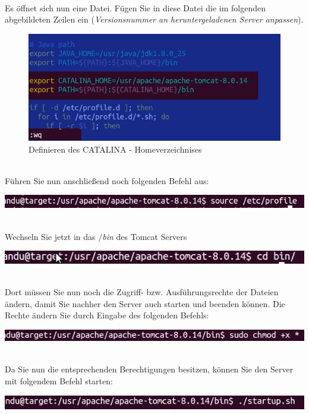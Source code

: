\documentclass[a4paper, 12pt]{scrreprt}
\begin{document}
\newpage
\ \\
Es öffnet sich nun eine Datei. Fügen Sie in diese Datei die im folgenden abgebildeten Zeilen ein ({\it Versionsnummer an heruntergeladenen Server anpassen}).
\begin{figure}[h]
\centering
\includegraphics[width=0.7\linewidth]{Grafiken/Catalina_Home}
\caption{Definieren des CATALINA - Homeverzeichnises}
\label{fig:Catalina_Home}
\end{figure}
\ \\
Führen Sie nun anschließend noch folgenden Befehl aus:
\begin{center}
\includegraphics[width=0.8\linewidth]{Grafiken/Befehl_idonKnow}
\end{center}
\ \\
Wechseln Sie jetzt in das {\it$/$bin} des Tomcat Servers
\begin{center}
\includegraphics[width=0.7\linewidth]{Grafiken/Bin_direct}
\end{center}
\ \\
Dort müssen Sie nun noch die Zugriff- bzw. Ausführungsrechte der Dateien ändern, damit Sie nachher den Server auch starten und beenden können. Die Rechte ändern Sie durch Eingabe des folgenden Befehls:
\begin{center}
\includegraphics[width=0.8\linewidth]{Grafiken/rechte}
\end{center}
\ \\
Da Sie nun die entsprechenden Berechtigungen besitzen, können Sie den Server mit folgendem Befehl starten:
\begin{center}
\includegraphics[width=0.8\linewidth]{Grafiken/Tomcat_starten_linux}
\end{center}
\end{document}
